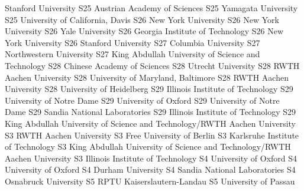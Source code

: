 \begin{multicols}{2}
{Stanford University}
{S25}
{}
{Austrian Academy of Sciences}
{S25}
{}
{Yamagata University}
{S25}
{}
{University of California, Davis}
{S26}
{}
{New York University}
{S26}
{}
{New York University}
{S26}
{}
{Yale University}
{S26}
{}
{Georgia Institute of Technology}
{S26}
{}
{New York University}
{S26}
{}
{Stanford University}
{S27}
{}
{Columbia University}
{S27}
{}
{Northwestern University}
{S27}
{}
{King Abdullah University of Science and Technology}
{S28}
{}
{Chinese Academy of Sciences}
{S28}
{}
{Utrecht University}
{S28}
{}
{RWTH Aachen University}
{S28}
{}
{University of Maryland, Baltimore}
{S28}
{}
{RWTH Aachen University}
{S28}
{}
{University of Heidelberg}
{S29}
{}
{Illinois Institute of Technology}
{S29}
{}
{University of Notre Dame}
{S29}
{}
{University of Oxford}
{S29}
{}
{University of Notre Dame}
{S29}
{}
{Sandia National Laboratories}
{S29}
{}
{Illinois Institute of Technology}
{S29}
{}
{King Abdullah University of Science and Technology/RWTH Aachen University}
{S3}
{}
{RWTH Aachen University}
{S3}
{}
{Free University of Berlin}
{S3}
{}
{Karlsruhe Institute of Technology}
{S3}
{}
{King Abdullah University of Science and Technology/RWTH Aachen University}
{S3}
{}
{Illinois Institute of Technology}
{S4}
{}
{University of Oxford}
{S4}
{}
{University of Oxford}
{S4}
{}
{Durham University}
{S4}
{}
{Sandia National Laboratories}
{S4}
{}
{Osnabruck University}
{S5}
{}
{RPTU Kaiserslautern-Landau}
{S5}
{}
{University of Passau}

\end{multicols}
